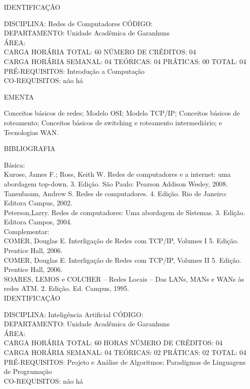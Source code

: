 \documentclass[
	12pt,				%
	openright,			%
  oneside,     %
	a4paper,			%
	english,			%
	french,				%
	spanish,			%
	brazil				%
	]{abntex2}
\begin{document}
\begin{apendicesenv}
\newpage IDENTIFICAÇÃO

DISCIPLINA: Redes de Computadores CÓDIGO:\\ 
DEPARTAMENTO: Unidade Acadêmica de Garanhuns\\
ÁREA: \\
CARGA HORÁRIA TOTAL: 60 NÚMERO DE CRÉDITOS: 04\\
CARGA HORÁRIA SEMANAL: 04 TEÓRICAS: 04 PRÁTICAS: 00 TOTAL: 04\\
PRÉ-REQUISITOS: Introdução a Computação\\
CO-REQUISITOS: não há

EMENTA 

Conceitos básicos de redes; Modelo OSI; Modelo TCP/IP; Conceitos básicos
de roteamento; Conceitos básicos de switching e roteamento
intermediário; e Tecnologias WAN.

BIBLIOGRAFIA 

Básica:\\
Kurose, James F.; Ross, Keith W. Redes de computadores e a internet: uma
abordagem top-down. 3. Edição. São Paulo: Pearson Addison Wesley, 2008.\\
Tanenbaum, Andrew S. Redes de computadores. 4. Edição. Rio de Janeiro:
Editora Campus, 2002.\\
Peterson,Larry. Redes de computadores: Uma abordagem de Sistemas. 3.
Edição. Editora Campos, 2004.\\
Complementar:\\
COMER, Douglas E. Interligação de Redes com TCP/IP, Volumes I 5. Edição.
Prentice Hall, 2006.\\
COMER, Douglas E. Interligação de Redes com TCP/IP, Volumes II 5.
Edição. Prentice Hall, 2006.\\
SOARES, LEMOS e COLCHER -- Redes Locais -- Das LANs, MANs e WANs às
redes ATM. 2. Edição. Ed. Campus, 1995.\\

\newpage IDENTIFICAÇÃO

DISCIPLINA: Inteligência Artificial CÓDIGO:\\ 
DEPARTAMENTO: Unidade Acadêmica de Garanhuns\\
ÁREA: \\
CARGA HORÁRIA TOTAL: 60 HORAS NÚMERO DE CRÉDITOS: 04\\
CARGA HORÁRIA SEMANAL: 04 TEÓRICAS: 02 PRÁTICAS: 02 TOTAL: 04\\
PRÉ-REQUISITOS: Projeto e Análise de Algoritmos; Paradigmas de Linguagens de Programação\\
CO-REQUISITOS: não há


\end{apendicesenv}
\end{document}
